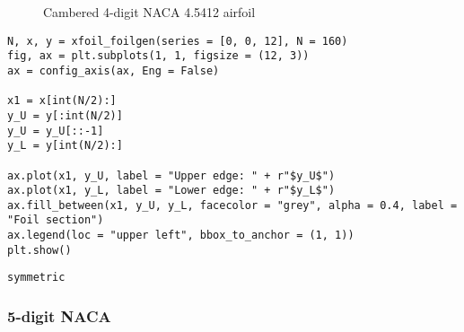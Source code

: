 \documentclass[11pt]{article}
\begin{document}
    
    

    
    
    
    
\begin{figure}
    \begin{center}
    \end{center}
    \caption{Cambered 4-digit NACA 4.5412 airfoil}      
    \label{fig:series4cam}
\end{figure}
\begin{lstlisting}
N, x, y = xfoil_foilgen(series = [0, 0, 12], N = 160)
fig, ax = plt.subplots(1, 1, figsize = (12, 3))
ax = config_axis(ax, Eng = False)

x1 = x[int(N/2):]
y_U = y[:int(N/2)]
y_U = y_U[::-1]
y_L = y[int(N/2):]

ax.plot(x1, y_U, label = "Upper edge: " + r"$y_U$")
ax.plot(x1, y_L, label = "Lower edge: " + r"$y_L$")
ax.fill_between(x1, y_U, y_L, facecolor = "grey", alpha = 0.4, label = "Foil section")
ax.legend(loc = "upper left", bbox_to_anchor = (1, 1))
plt.show()
\end{lstlisting}%
    \begin{Verbatim}[commandchars=\\\{\}]
symmetric

    \end{Verbatim}

    
\begin{figure}
    \begin{center}
    \end{center}
\end{figure}
    
    \hypertarget{digit-naca}{%
\subsubsection{5-digit NACA}\label{digit-naca}}
\end{document}
